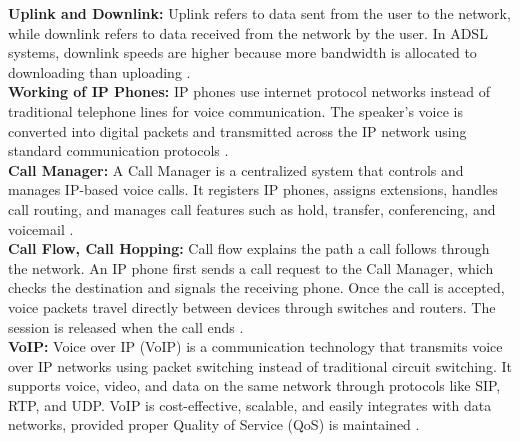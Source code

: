 \documentclass[a4paper,12pt]{article}
\begin{document}
\noindent
\textbf{Uplink and Downlink: }Uplink refers to data sent from the user to the network, while downlink refers to data received from the network by the user. In ADSL systems, downlink speeds are higher because more bandwidth is allocated to downloading than uploading \cite{linkpp_uplink_downlink_2025}.\\

\noindent
\textbf{Working of IP Phones: }IP phones use internet protocol networks instead of traditional telephone lines for voice communication. The speaker’s voice is converted into digital packets and transmitted across the IP network using standard communication protocols \cite{geeksforgeeks_voip}.\\

\noindent
\textbf{Call Manager: }A Call Manager is a centralized system that controls and manages IP-based voice calls. It registers IP phones, assigns extensions, handles call routing, and manages call features such as hold, transfer, conferencing, and voicemail \cite{netcomlearning_cucm}.\\

\noindent
\textbf{Call Flow, Call Hopping: } Call flow explains the path a call follows through the network. An IP phone first sends a call request to the Call Manager, which checks the destination and signals the receiving phone. Once the call is accepted, voice packets travel directly between devices through switches and routers. The session is released when the call ends \cite{cisco_uc_flow_uc5}.\\

\noindent
\textbf{VoIP: }Voice over IP (VoIP) is a communication technology that transmits voice over IP networks using packet switching instead of traditional circuit switching. It supports voice, video, and data on the same network through protocols like SIP, RTP, and UDP. VoIP is cost-effective, scalable, and easily integrates with data networks, provided proper Quality of Service (QoS) is maintained \cite{geeksforgeeks_voip}.\\
\end{document}
